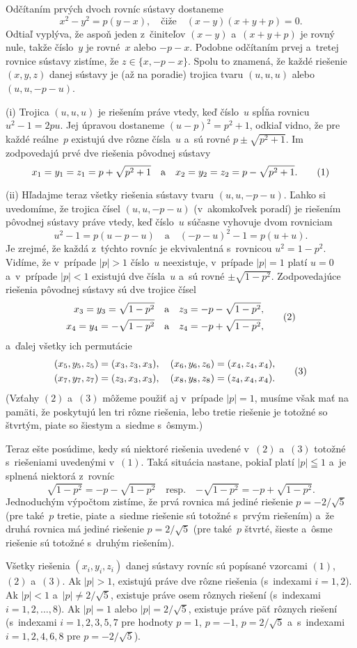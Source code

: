 {%
Odčítaním prvých dvoch rovníc sústavy dostaneme
$$
x^2-y^2=p(y-x),\quad\text{čiže}\quad
(x-y)(x+y+p)=0.
$$
Odtiaľ vyplýva, že aspoň jeden z~činiteľov $(x-y)$ a~$(x+y+p)$ je
rovný nule, takže číslo~$y$ je rovné~$x$ alebo
${-p}-x$. Podobne odčítaním prvej a~tretej rovnice sústavy
zistíme, že $z\in\{x,{-p}-x\}$. Spolu to znamená, že
každé riešenie $(x,y,z)$ danej sústavy je (až na poradie) trojica
tvaru $(u,u,u)$ alebo $(u,u,{-p}-u)$.

\smallskip
(i) Trojica $(u,u,u)$ je riešením práve vtedy, keď číslo~$u$ spĺňa
rovnicu $u^2-1=2pu$. Jej úpravou dostaneme $(u-p)^2=p^2+1$,
odkiaľ vidno, že pre každé reálne~$p$ existujú dve rôzne čísla~$u$
a~sú rovné $p\pm\sqrt{p^2+1}$. Im zodpovedajú prvé dve
riešenia pôvodnej sústavy
$$
x_1=y_1=z_1=p+\sqrt{p^2+1}\quad\text{a}\quad
x_2=y_2=z_2=p-\sqrt{p^2+1}.
\tag1
$$

\smallskip
(ii) Hľadajme teraz všetky riešenia sústavy tvaru $(u,u,{-p}-u)$.
Ľahko si uvedomíme, že trojica čísel $(u,u,-p-u)$
(v~akomkoľvek poradí) je riešením pôvodnej sústavy
práve vtedy, keď číslo~$u$ súčasne vyhovuje dvom rovniciam
$$
u^2-1=p(u-p-u)\quad\text{a}\quad
({-p}-u)^2-1=p(u+u).
$$
Je zrejmé, že každá z~týchto rovníc je ekvivalentná s~rovnicou
$u^2=1-p^2$. Vidíme, že v~prípade $|p|>1$ číslo~$u$
neexistuje, v~prípade $|p|=1$ platí $u=0$ a~v~prípade
$|p|<1$ existujú dve čísla~$u$ a~sú rovné
$\pm\sqrt{1-p^2}$. Zodpovedajúce riešenia pôvodnej sústavy
sú dve trojice čísel
$$
\aligned
x_3=y_3= \sqrt{1-p^2}\quad&\text{a}\quad  z_3={-p}-\sqrt{1-p^2},\\
x_4=y_4=-\sqrt{1-p^2}\quad&\text{a}\quad  z_4={-p}+\sqrt{1-p^2},
\endaligned
\tag2
$$
a~ďalej všetky ich permutácie
$$
\aligned
(x_5,y_5,z_5)&=(x_3,z_3,x_3),\quad
(x_6,y_6,z_6)=(x_4,z_4,x_4),\\
(x_7,y_7,z_7)&=(z_3,x_3,x_3),\quad
(x_8,y_8,z_8)=(z_4,x_4,x_4).
\endaligned
\tag3
$$
(Vzťahy $(2)$ a~$(3)$ môžeme použiť aj v~prípade $|p|=1$, musíme však
mať na pamäti, že poskytujú len tri rôzne riešenia, lebo tretie
riešenie je totožné so štvrtým, piate so šiestym a~siedme s~ôsmym.)

\smallskip
Teraz ešte posúdime, kedy sú niektoré riešenia uvedené v~$(2)$ a~$(3)$
totožné s~riešeniami uvedenými v~$(1)$. Taká
situácia nastane, pokiaľ platí $|p|\leqq1$ a~je splnená niektorá
z~rovníc
$$
\sqrt{1-p^2}={-p}-\sqrt{1-p^2}\quad\text{resp.}\quad
{-\sqrt{1-p^2}}={-p}+\sqrt{1-p^2}.
$$
Jednoduchým výpočtom zistíme, že prvá rovnica má jediné riešenie
$p={-2}/\sqrt5$ (pre také~$p$ tretie, piate a~siedme riešenie
sú totožné s~prvým riešením) a~že druhá rovnica má
jediné riešenie $p=2/\sqrt5$ (pre také~$p$ štvrté, šieste
a~ôsme riešenie sú totožné s~druhým riešením).

\odpoved
Všetky riešenia $(x_i,y_i,z_i)$ danej sústavy
rovníc sú popísané vzorcami $(1)$, $(2)$ a~$(3)$. Ak $|p|>1$,
existujú práve dve rôzne riešenia (s~indexami $i=1,2$).
Ak $|p|<1$ a~$|p|\ne2/\sqrt5$,
existuje práve osem rôznych riešení (s~indexami $i=1,2,\dots,8$).
Ak $|p|=1$ alebo $|p|=2/\sqrt5$,
existuje práve päť rôznych riešení (s~indexami $i=1,2,3,5,7$ pre
hodnoty $p=1$, $p=-1$, $p=2/\sqrt5$ a~s~indexami
$i=1,2,4,6,8$ pre $p={-2}/\sqrt5$).}

